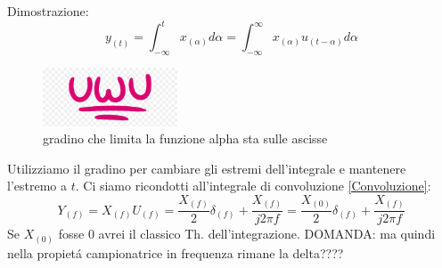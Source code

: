                     
                    Dimostrazione:\\
                        \[
                            y_{(t)} = \int_{-\infty}^{t} x_{(\alpha)} d\alpha =\int_{-\infty}^{\infty} x_{(\alpha)} u_{(t-\alpha)} d\alpha
                        \]
                        \begin{figure}[H]
                            \centering
                            \includegraphics[width=4cm]{media/uwu.png}
                            \caption{gradino che limita la funzione alpha sta sulle ascisse}
                            \label{fig:gradino che limite la funzione}
                        \end{figure}
                        Utilizziamo il gradino per cambiare gli estremi dell'integrale e mantenere l'estremo a $t$. Ci siamo ricondotti all'integrale di convoluzione \ref{Convoluzione}:
                        \[
                            Y_{(f)} =X_{(f)} U_{(f)} = \frac{X_{(f)}}{2}\delta_{(f)} +\frac{X_{(f)}}{j2\pi f} =\frac{X_{(0)}}{2}\delta_{(f)} +\frac{X_{(f)}}{j2\pi f}    
                        \]
                        Se $X_{(0)}$ fosse $0$ avrei il classico Th. dell'integrazione.
                        DOMANDA: ma quindi nella propietá campionatrice in frequenza rimane la delta????